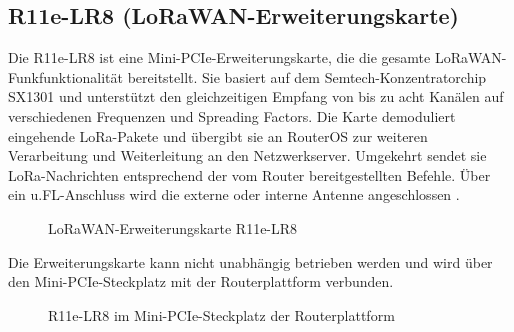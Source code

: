 	\subsection{R11e-LR8 (LoRaWAN-Erweiterungskarte)}
		Die R11e-LR8 ist eine Mini-PCIe-Erweiterungskarte, die die gesamte LoRaWAN-Funkfunktionalität bereitstellt. Sie basiert auf dem Semtech-Konzentratorchip SX1301 und unterstützt den gleichzeitigen Empfang von bis zu acht Kanälen auf verschiedenen Frequenzen und Spreading Factors. Die Karte demoduliert eingehende LoRa-Pakete und übergibt sie an RouterOS zur weiteren Verarbeitung und Weiterleitung an den Netzwerkserver. Umgekehrt sendet sie LoRa-Nachrichten entsprechend der vom Router bereitgestellten Befehle. Über ein u.FL-Anschluss wird die externe oder interne Antenne angeschlossen \cite{mikrotik:2024}.
		
		\begin{figure}[H]
			\centering
			\caption{LoRaWAN-Erweiterungskarte R11e-LR8}
		\end{figure}
		
		Die Erweiterungskarte kann nicht unabhängig betrieben werden und wird über den Mini-PCIe-Steckplatz mit der Routerplattform verbunden.
		
		\begin{figure}[H]
			\centering
			\caption{R11e-LR8 im Mini-PCIe-Steckplatz der Routerplattform}
		\end{figure}
		
